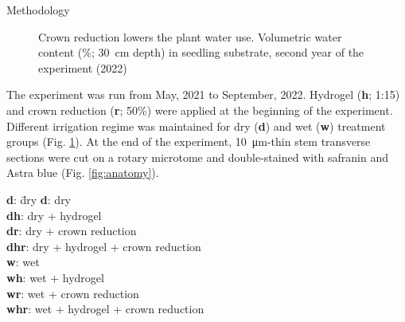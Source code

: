 \documentclass[final]{beamer}
\newlength{\colwidth}
\begin{document}
\begin{frame}[t]
\begin{columns}[t]
\begin{column}{\colwidth}
\begin{block}{Methodology}
\begin{minipage}[t]{0.45\textwidth}
    \begin{figure}
        
        \caption{Crown reduction lowers the plant water use. Volumetric water content (\%; \SI{30}{\centi\meter} depth) in seedling substrate, second year of the experiment (2022)}
        \label{fig:vwc}
    \end{figure}
\end{minipage}\hfill
\normalsize
\begin{minipage}[t]{0.45\textwidth}
    The experiment was run from May, 2021 to September, 2022.
    Hydrogel (\textbf{h}; 1:15) and crown reduction (\textbf{r}; 50\%) were applied at the beginning of the experiment.
    Different irrigation regime was maintained for dry (\textbf{d}) and wet (\textbf{w}) treatment groups (Fig. \ref{fig:vwc}).
    At the end of the experiment, \SI{10}{\micro\meter}-thin stem transverse sections were cut on a rotary microtome and double-stained with safranin and Astra blue (Fig. \ref{fig:anatomy}).

\begin{tabbing}
    \textbf{d}: \quad\= dry \kill
    \textbf{d}: \> dry \\
    \textbf{dh}: \> dry + hydrogel \\
    \textbf{dr}: \> dry + crown reduction \\
    \textbf{dhr}: \> dry + hydrogel + crown reduction \\
    \textbf{w}: \> wet \\
    \textbf{wh}: \> wet + hydrogel \\
    \textbf{wr}: \> wet + crown reduction \\
    \textbf{whr}: \> wet + hydrogel + crown reduction
\end{tabbing}
\end{minipage}\hfill



\end{block}
\end{column}
\end{columns}
\end{frame}
\end{document}
